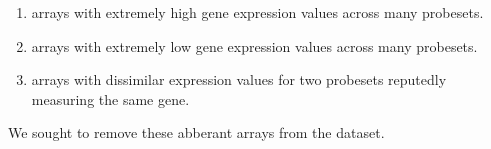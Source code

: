 \documentclass{bioinfo}
\begin{document}
\begin{methods}
\renewcommand{\labelenumi}{\Alph{enumi}.}
\begin{enumerate}
\item arrays with extremely high gene expression values across many probesets.
\item arrays with extremely low gene expression values across many probesets.
\item arrays with dissimilar expression values for two probesets reputedly
measuring the same gene.
\end{enumerate}

We sought to remove these abberant arrays from the dataset.



\end{methods}
\end{document}

